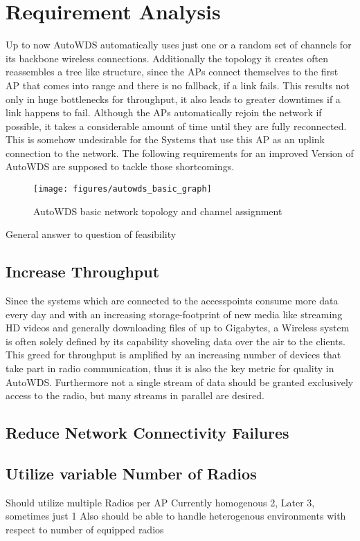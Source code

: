 \chapter{Requirement Analysis}
  Up to now AutoWDS automatically uses just one or a random set of channels for its backbone wireless connections. 
  Additionally the topology it creates often reassembles a tree like structure, since the APs connect themselves 
  to the first AP that comes into range and there is no fallback, if a link fails. This results not only in huge bottlenecks for throughput,
  it also leads to greater downtimes if a link happens to fail. Although the APs automatically rejoin the network if possible, it takes
  a considerable amount of time until they are fully reconnected. This is somehow undesirable for the Systems that use this AP as an uplink connection to
  the network. The following requirements for an improved Version of AutoWDS are supposed to tackle those shortcomings.
  \begin{figure}[t]
    \centering
    \texttt{[image: figures/autowds\_basic\_graph]}
    \caption{AutoWDS basic network topology and channel assignment}
    \label{fig:autowds_basic_graph}
  \end{figure}
General answer to question of feasibility
  \section{Increase Throughput}
  Since the systems which are connected to the accesspoints consume more data every day and with an increasing storage-footprint of new media like streaming HD videos
  and generally downloading files of up to Gigabytes, a Wireless system is often solely defined by its capability shoveling data over the air to the clients.
  This greed for throughput is amplified by an increasing number of devices that take part in radio communication, 
  thus it is also the key metric for quality in AutoWDS. Furthermore not a single stream of data should be granted exclusively access to the radio, but
  many streams in parallel are desired.
  \section{Reduce Network Connectivity Failures}
\section{Utilize variable Number of Radios}
  Should utilize multiple Radios per AP\newline
  Currently homogenous 2, Later 3, sometimes just 1 \newline
  Also should be able to handle heterogenous environments with respect to number of equipped radios \newline

